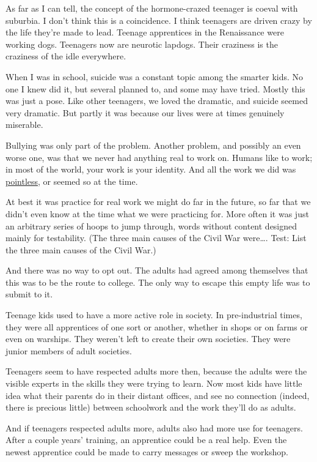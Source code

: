 As far as I can tell, the concept of the hormone-crazed teenager is
coeval with suburbia. I don't think this is a coincidence. I think
teenagers are driven crazy by the life they're made to lead. Teenage
apprentices in the Renaissance were working dogs. Teenagers now are
neurotic lapdogs. Their craziness is the craziness of the idle
everywhere.

When I was in school, suicide was a constant topic among the smarter
kids. No one I knew did it, but several planned to, and some may have
tried. Mostly this was just a pose. Like other teenagers, we loved the
dramatic, and suicide seemed very dramatic. But partly it was because
our lives were at times genuinely miserable.

Bullying was only part of the problem. Another problem, and possibly an
even worse one, was that we never had anything real to work on. Humans
like to work; in most of the world, your work is your identity. And all
the work we did was \href{essay.html}{pointless}, or seemed so at the
time.

At best it was practice for real work we might do far in the future, so
far that we didn't even know at the time what we were practicing for.
More often it was just an arbitrary series of hoops to jump through,
words without content designed mainly for testability. (The three main
causes of the Civil War were\ldots. Test: List the three main causes of
the Civil War.)

And there was no way to opt out. The adults had agreed among themselves
that this was to be the route to college. The only way to escape this
empty life was to submit to it.

Teenage kids used to have a more active role in society. In
pre-industrial times, they were all apprentices of one sort or another,
whether in shops or on farms or even on warships. They weren't left to
create their own societies. They were junior members of adult societies.

Teenagers seem to have respected adults more then, because the adults
were the visible experts in the skills they were trying to learn. Now
most kids have little idea what their parents do in their distant
offices, and see no connection (indeed, there is precious little)
between schoolwork and the work they'll do as adults.

And if teenagers respected adults more, adults also had more use for
teenagers. After a couple years' training, an apprentice could be a real
help. Even the newest apprentice could be made to carry messages or
sweep the workshop.

